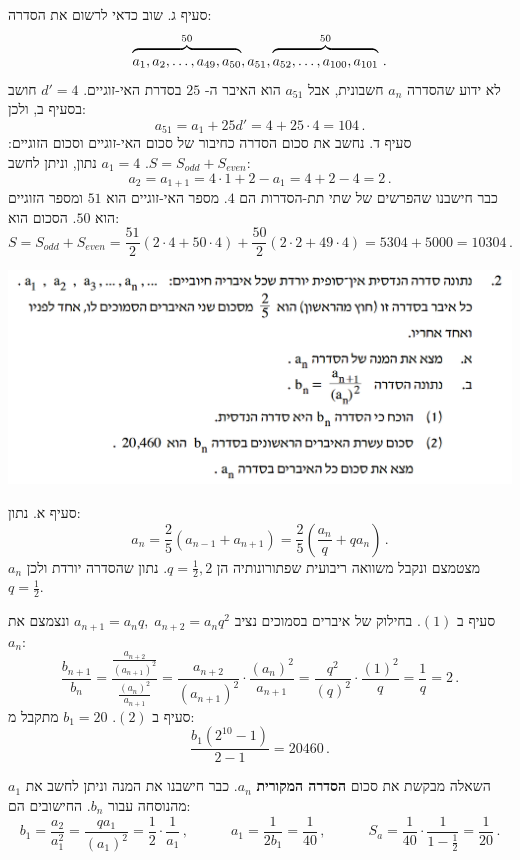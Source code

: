 \documentclass[12pt,a4paper]{article}
\begin{document}
סעיף ג. שוב כדאי לרשום את הסדרה:
\[
\overbrace{\rule{0pt}{8pt}a_1, a_2, \ldots, a_{49}, a_{50}}^{50}, a_{51}, \overbrace{\rule{0pt}{8pt}a_{52}, \ldots, a_{100}, a_{101}}^{50}\,.
\]
לא ידוע שהסדרה
$a_{n}$
חשבונית, אבל
$a_{51}$
הוא האיבר ה-%
$25$
בסדרת האי-זוגיים.
$d'=4$
חושב בסעיף ב, ולכן:
\[
a_{51}=a_1+25d' =4+25\cdot 4=104\,.
\]
סעיף ד. נחשב את סכום הסדרה כחיבור של סכום האי-זוגיים וסכום הזוגיים:
$S=S_{\mathit{odd}} + S_{\mathit{even}}$.
$a_1=4$
נתון, וניתן לחשב:
\[
a_2=a_{1+1}=4\cdot 1+2-a_1=4+2-4=2\,.
\]
כבר חישבנו שהפרשים של שתי תת-הסדרות הם 
$4$.
מספר האי-זוגיים הוא
$51$
ומספר הזוגיים הוא
$50$.
הסכום הוא:
\[
S=S_{\mathit{odd}} + S_{\mathit{even}}=\frac{51}{2}(2\cdot 4+50\cdot 4)+\frac{50}{2}(2\cdot 2+49\cdot 4)=5304+5000=10304\,.
\]
\vspace{-4ex}

\bigskip

\textbf{}

\begin{center}
\includegraphics[width=.95\textwidth]{summer-2015a-2}
\end{center}
\vspace{-1ex}
סעיף א. נתון:
\[
a_n = \frac{2}{5}(a_{n-1}+a_{n+1}) =\frac{2}{5}\left(\frac{a_n}{q}+qa_n\right)\,.
\]
$a_n$
מצטמצם ונקבל משוואה ריבועית שפתורונותיה הן 
$q=\frac{1}{2},2$.
נתון שהסדרה יורדת ולכן
$q=\frac{1}{2}$.

סעיף ב
$(1)$.
בחילוק של איברים בסמוכים נציב
$a_{n+1}=a_nq,\;a_{n+2}=a_nq^2$
ונצמצם את
$a_n$:
\[
\frac{b_{n+1}}{b_n} = \frac{\displaystyle\frac{a_{n+2}}{(a_{n+1})^2}}{\displaystyle\frac{(a_{n})^2}{a_{n+1}}}= \frac{a_{n+2}}{(a_{n+1})^2}\cdot\frac{(a_{n})^2}{a_{n+1}} = \frac{q^2}{(q)^2}\cdot\frac{(1)^2}{q}=\frac{1}{q}=2\,.
\]
סעיף ב
$(2)$. 
$b_1=20$
מתקבל מ:
\[
\frac{b_1(2^{10}-1)}{2-1}=20460\,.
\]

השאלה מבקשת את סכום 
\textbf{הסדרה המקורית}
$a_{n}$.
כבר חישבנו את המנה וניתן לחשב את
$a_1$
מהנוסחה עבור 
$b_n$.
החישובים הם:
\[
b_1 = \frac{a_2}{a_1^2} = \frac{qa_1}{(a_1)^2} = \frac{1}{2}\cdot\frac{1}{a_1}\,,\quad\quad\quad a_1=\frac{1}{2b_1}=\frac{1}{40}\,,\quad\quad\quad S_a = \frac{1}{40}\cdot\frac{1}{1-\frac{1}{2}} = \frac{1}{20}\,.
\]
\vspace{-4ex}
\bigskip
\end{document}
